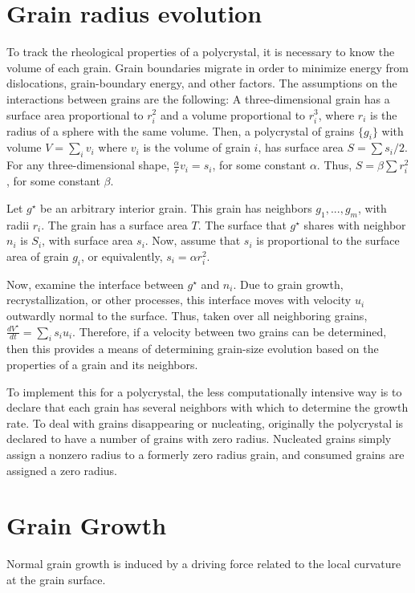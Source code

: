 \documentclass{igs}
\begin{document}
\section{Grain radius evolution}
To track the rheological properties of a polycrystal, it is necessary to know the volume of each grain. Grain boundaries migrate in order to minimize energy from dislocations, grain-boundary energy, and other factors. The assumptions on the interactions between grains are the following: A three-dimensional grain has a surface area proportional to $r^2_i$ and a volume proportional to $r^3_i$, where $r_i$ is the radius of a sphere with the same volume. Then, a polycrystal of grains $\{g_i\}$ with volume $V=\sum_i v_i$ where $v_i$ is the volume of grain $i$, has surface area $S=\sum s_i/2$. For any three-dimensional shape, $\frac{\alpha}{r} v_i =  s_i$, for some constant $\alpha$. Thus, $S=\beta \sum r_i^2$, for some constant $\beta$.

Let $g^{\star}$ be an arbitrary interior grain. This grain has neighbors $g_1,...,g_m$, with radii $r_i$. The grain has a surface area $T$. The surface that $g^{\star}$ shares with neighbor $n_i$ is $S_i$, with surface area $s_i$. Now, assume that $s_i$ is proportional to the surface area of grain $g_i$, or equivalently, $s_i=\alpha r_i^2$.

Now, examine the interface between $g^{\star}$ and $n_i$. Due to grain growth, recrystallization, or other processes, this interface moves with velocity $u_i$ outwardly normal to the surface. Thus, taken over all neighboring grains, $\frac{dV^{\star}}{dt}=\sum_{i}s_i u_i$. Therefore, if a velocity between two grains can be determined, then this provides a means of determining grain-size evolution based on the properties of a grain and its neighbors.

To implement this for a polycrystal, the less computationally intensive way is to declare that each grain has several neighbors with which to determine the growth rate. To deal with grains disappearing or nucleating, originally the polycrystal is declared to have a number of grains with zero radius. Nucleated grains simply assign a nonzero radius to a formerly zero radius grain, and consumed grains are assigned a zero radius. 
\section{Grain Growth}
Normal grain growth is induced by a driving force related to the local curvature at the grain surface.
\end{document}
